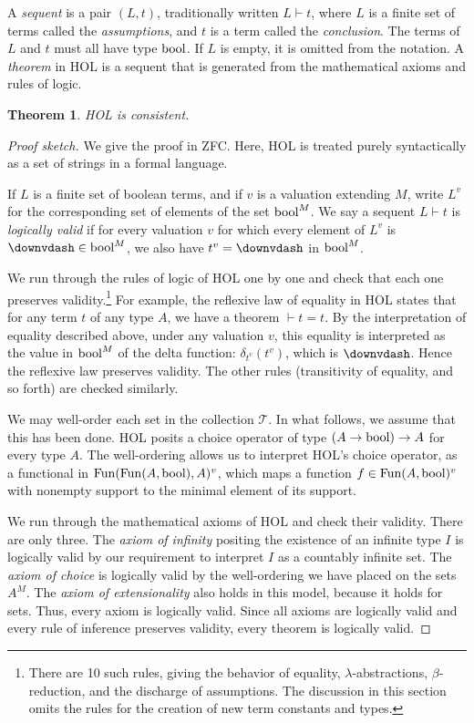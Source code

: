 \documentclass[brochure,english,12pt]{bourbaki}
\theoremstyle{plain}
\newtheorem{theorem}[equation]{Theorem}
\def\T{{\mathcal T}}
\begin{document}
A {\it sequent} is a pair $(L,t)$, traditionally written $L\vdash t$, where $L$ is a finite set of terms
called the {\it assumptions}, and $t$ is a term called the {\it conclusion}.  The
terms of $L$ and $t$ must all have type ${\operatorname{bool}}$.   If $L$ is empty, it is omitted from the
notation.  A {\it theorem} in HOL is a sequent that is generated from the mathematical axioms
and rules of logic.  

\begin{theorem} HOL is consistent.
\end{theorem}

\begin{proof}[Proof sketch]
We give the proof in ZFC.  Here, HOL is treated purely syntactically as a set of strings in 
a formal language.

If $L$ is a finite set of boolean terms, and if $v$ is a valuation extending $M$,  
write $L^{v}$ for the corresponding set of elements of the set ${\operatorname{bool}}^M$.
We say a sequent $L \vdash t$ is {\it logically valid}
if for every valuation $v$ for which every element of $L^{v}$ is $\downvdash \in \bool^M$, we also have
$t^{v}=\downvdash $ in ${\operatorname{bool}}^M$.

We run through the rules of logic of HOL one by one and check that each one preserves
validity.\footnote{There are 10 such rules, giving the behavior of equality, $\lambda$-abstractions, $\beta$-reduction,
and the discharge of assumptions.
The discussion in this section omits the rules for the creation of new  term constants and types.
}
For example, the reflexive law of equality in HOL states that for any term $t$
of any type $A$, we have a theorem $\vdash t = t$.  By the interpretation of equality described above, under
any valuation $v$, this equality is interpreted as the value in ${\operatorname{bool}}^M$ of the delta function: 
$\delta_{t^{v}}(t^{v})$, which is $\downvdash $.  Hence the reflexive law preserves validity.
The other rules (transitivity of equality, and so forth) are checked similarly.

We may well-order
 each set in the collection $\T$. In what follows, we 
assume that this
has been done.  HOL posits a choice operator of type $(A\to{\operatorname{bool}})\to A$ for every type $A$.  The well-ordering  
allows us to 
interpret HOL's choice operator, as a functional
in ${\operatorname{Fun}}({\operatorname{Fun}}(A,{\operatorname{bool}}),A)^{v}$, 
which maps a function $f\in {\operatorname{Fun}}(A,{\operatorname{bool}})^{v}$ with nonempty support to
the minimal element of its support.

We run through the mathematical axioms of HOL and check their validity. 
There are only three.  The {\it axiom
of infinity} positing the existence of an infinite type $I$
is logically valid by our requirement to interpret $I$ as a countably infinite set.  The {\it axiom of
choice} is logically valid by the well-ordering we have placed on the sets $A^M$.  The {\it axiom
of extensionality} also holds in this model, because it holds for sets.
Thus, every axiom is logically valid.  
Since all axioms are logically valid and every rule of inference
preserves validity, every theorem is logically valid.


\end{proof}
\end{document}
